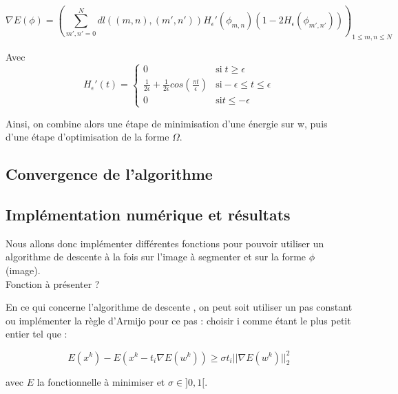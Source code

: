 \[ \nabla E (\phi) = ( \sum \limits_{m',n' = 0}^N dl((m,n),(m',n')) H_{\epsilon}' (\phi_{m,n}) ( 1 - 2H_{\epsilon}(\phi_{m',n'})) ) _{1 \leq m,n \leq N}  \] 

Avec 
\[ H_{\epsilon}' (t) = \left\{ \begin{matrix}
0 & \text{si} \; t \geq \epsilon \\
\frac{1}{2 \epsilon} + \frac{1}{2 \epsilon} cos(\frac{\pi t}{\epsilon}) & \text{si} -\epsilon \leq t \leq \epsilon \\
0 & \text{si} t \leq - \epsilon 
\end{matrix} \right. \] 


Ainsi, on combine alors une étape de minimisation d'une énergie sur w, puis d'une étape d'optimisation de la forme $\Omega$. 
\subsection{Convergence de l'algorithme}
\subsection{Implémentation numérique et résultats}

Nous allons donc implémenter différentes fonctions pour pouvoir utiliser un algorithme de descente à la fois sur l'image à segmenter et sur la forme $\phi$ (image). \\

Fonction à présenter ? 

En ce qui concerne l'algorithme de descente , on peut soit utiliser un pas constant  ou implémenter la règle d'Armijo pour ce pas : choisir i comme étant le plus petit entier tel que : 

\[ E(x^k) - E(x^k - t_i \nabla E(w^k)) \geq \sigma t_i || \nabla E(w^k)||_2^2\] 

avec $E$ la fonctionnelle à minimiser et $\sigma \in ]0,1[$. 

